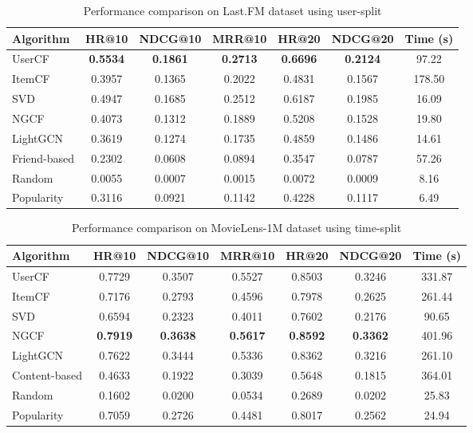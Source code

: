 \documentclass[sigconf,nonacm]{acmart} %
\begin{document}
\begin{table}[h]  
\caption{Performance comparison on Last.FM dataset using user-split}  
\label{tab:lastfm}  
\centering  
\scriptsize  
\begin{tabular}{lcccccc}  
\hline  
\textbf{Algorithm} & \textbf{HR@10} & \textbf{NDCG@10} & \textbf{MRR@10} & \textbf{HR@20} & \textbf{NDCG@20} & \textbf{Time (s)} \\
\hline  
UserCF & \textbf{0.5534} & \textbf{0.1861} & \textbf{0.2713} & \textbf{0.6696} & \textbf{0.2124} & 97.22 \\
ItemCF & 0.3957 & 0.1365 & 0.2022 & 0.4831 & 0.1567 & 178.50 \\
SVD & 0.4947 & 0.1685 & 0.2512 & 0.6187 & 0.1985 & 16.09 \\
NGCF & 0.4073 & 0.1312 & 0.1889 & 0.5208 & 0.1528 & 19.80 \\
LightGCN & 0.3619 & 0.1274 & 0.1735 & 0.4859 & 0.1486 & 14.61 \\
Friend-based & 0.2302 & 0.0608 & 0.0894 & 0.3547 & 0.0787 & 57.26 \\
Random & 0.0055 & 0.0007 & 0.0015 & 0.0072 & 0.0009 & 8.16 \\
Popularity & 0.3116 & 0.0921 & 0.1142 & 0.4228 & 0.1117 & 6.49 \\
\hline  
\end{tabular}  
\end{table}  

\begin{table}[h]  
\caption{Performance comparison on MovieLens-1M dataset using time-split}  
\label{tab:temporal}  
\centering  
\scriptsize  
\begin{tabular}{lcccccc}  
\hline  
\textbf{Algorithm} & \textbf{HR@10} & \textbf{NDCG@10} & \textbf{MRR@10} & \textbf{HR@20} & \textbf{NDCG@20} & \textbf{Time (s)} \\
\hline  
UserCF & 0.7729 & 0.3507 & 0.5527 & 0.8503 & 0.3246 & 331.87 \\
ItemCF & 0.7176 & 0.2793 & 0.4596 & 0.7978 & 0.2625 & 261.44 \\
SVD & 0.6594 & 0.2323 & 0.4011 & 0.7602 & 0.2176 & 90.65 \\
NGCF & \textbf{0.7919} & \textbf{0.3638} & \textbf{0.5617} & \textbf{0.8592} & \textbf{0.3362} & 401.96 \\
LightGCN & 0.7622 & 0.3444 & 0.5336 & 0.8362 & 0.3216 & 261.10 \\
Content-based & 0.4633 & 0.1922 & 0.3039 & 0.5648 & 0.1815 & 364.01 \\
Random & 0.1602 & 0.0200 & 0.0534 & 0.2689 & 0.0202 & 25.83 \\
Popularity & 0.7059 & 0.2726 & 0.4481 & 0.8017 & 0.2562 & 24.94 \\
\hline  
\end{tabular}  
\end{table}  
\end{document}
